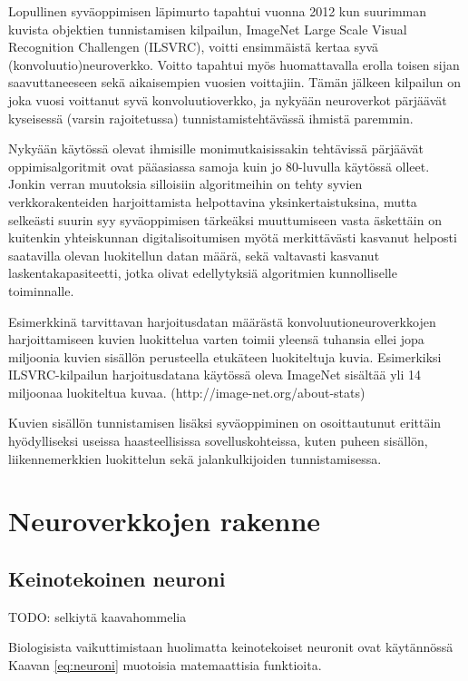 \documentclass[finnish]{tktltiki2}
\theoremstyle{definition}
\theoremstyle{remark}
\begin{document}
  Lopullinen syväoppimisen läpimurto tapahtui vuonna 2012 kun suurimman kuvista objektien tunnistamisen kilpailun, ImageNet Large Scale Visual Recognition Challengen (ILSVRC), voitti ensimmäistä kertaa syvä (konvoluutio)neuroverkko. Voitto tapahtui myös huomattavalla erolla toisen sijan saavuttaneeseen sekä aikaisempien vuosien voittajiin. Tämän jälkeen kilpailun on joka vuosi voittanut syvä konvoluutioverkko, ja nykyään neuroverkot pärjäävät kyseisessä (varsin rajoitetussa) tunnistamistehtävässä ihmistä paremmin.

  Nykyään käytössä olevat ihmisille monimutkaisissakin tehtävissä pärjäävät oppimisalgoritmit ovat pääasiassa samoja kuin jo 80-luvulla käytössä olleet. Jonkin verran muutoksia silloisiin algoritmeihin on tehty syvien verkkorakenteiden harjoittamista helpottavina yksinkertaistuksina, mutta selkeästi suurin syy syväoppimisen tärkeäksi muuttumiseen vasta äskettäin on kuitenkin yhteiskunnan digitalisoitumisen myötä merkittävästi kasvanut helposti saatavilla olevan luokitellun datan määrä, sekä valtavasti kasvanut laskentakapasiteetti, jotka olivat edellytyksiä algoritmien kunnolliselle toiminnalle.

  Esimerkkinä tarvittavan harjoitusdatan määrästä konvoluutioneuroverkkojen harjoittamiseen kuvien luokittelua varten toimii yleensä tuhansia ellei jopa miljoonia kuvien sisällön perusteella etukäteen luokiteltuja kuvia. Esimerkiksi ILSVRC-kilpailun harjoitusdatana käytössä oleva ImageNet sisältää yli 14 miljoonaa luokiteltua kuvaa. (http://image-net.org/about-stats)

  Kuvien sisällön tunnistamisen lisäksi syväoppiminen on osoittautunut erittäin hyödylliseksi useissa haasteellisissa sovelluskohteissa, kuten puheen sisällön, liikennemerkkien luokittelun sekä jalankulkijoiden tunnistamisessa.


  \section{Neuroverkkojen rakenne}
  \subsection{Keinotekoinen neuroni}

    TODO: selkiytä kaavahommelia

    Biologisista vaikuttimistaan huolimatta keinotekoiset neuronit ovat käytännössä Kaavan \ref{eq:neuroni} muotoisia matemaattisia funktioita.
\end{document}
